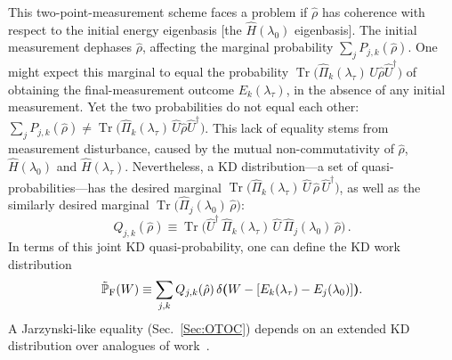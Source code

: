 \documentclass[%
 reprint,
superscriptaddress,
nofootinbib,
bibnotes,
 amsmath,amssymb,
 aps,
]{revtex4-1}
\theoremstyle{plain}
\DeclareMathOperator{\Tr}{Tr}
\newcommand{\LParen}{ \bm{(} }
\newcommand{\RParen}{ \bm{)} }
\begin{document}
This two-point-measurement scheme faces a problem if $\hat{\rho}$ has coherence with respect to the initial energy eigenbasis [the $\hat{H}(\lambda_0)$ eigenbasis].
The initial measurement dephases $\hat{\rho}$, affecting the marginal probability $\sum_j P_{j,k}(\hat{\rho})$. 
One might expect this marginal to equal the probability 
$\Tr\LParen \hat{\Pi}_k(\lambda_\tau) \, \hat{U} \hat{\rho} \hat{U}^\dagger \RParen$ of obtaining the final-measurement outcome $E_k(\lambda_\tau)$, in the absence of any initial measurement. Yet the two probabilities do not equal each other:
$\sum_j  P_{j,k}(\hat{\rho}) 
\neq \Tr\LParen \hat{\Pi}_k(\lambda_\tau) \, \hat{U} \hat{\rho} \hat{U}^\dagger \RParen$. 
This lack of equality stems from measurement disturbance, caused by
the mutual non-commutativity of $\hat{\rho}$, $\hat{H}(\lambda_0)$ and $\hat{H}(\lambda_\tau)$.
Nevertheless, a KD distribution---a set of quasi-probabilities---has the desired marginal 
$\Tr\LParen \hat{\Pi}_k(\lambda_\tau) \, \hat{U} \, \hat{\rho} \, \hat{U}^\dagger\RParen$,
as well as the similarly desired marginal
$\Tr\LParen \hat{\Pi}_j(\lambda_0) \, \hat{\rho} \RParen$:
\begin{equation}\label{eq:work_KD}
    Q_{j,k}(\hat{\rho}) 
    \equiv \Tr\bm{(}\hat{U}^\dagger \, \hat{\Pi}_k(\lambda_\tau) \, \hat{U} \, \hat{\Pi}_j(\lambda_0) \, \hat{\rho} \bm{)}\, .
\end{equation}
In terms of this joint KD quasi-probability, one can define
the KD work distribution~\cite{allahverdyan_nonequilibrium_2014} 
\begin{align}
   \tilde{\mathbb{P}}_{\rm F}(W) 
   \equiv \sum_{j,k} Q_{j,k}(\hat{\rho}) \, 
   \delta\LParen W - [E_k(\lambda_\tau) - E_j(\lambda_0)]\RParen .
\end{align} 
A Jarzynski-like equality (Sec.~\ref{Sec:OTOC}) depends on an extended KD distribution over analogues of work~\cite{NYH_jarzynski_2017}.
\end{document}

